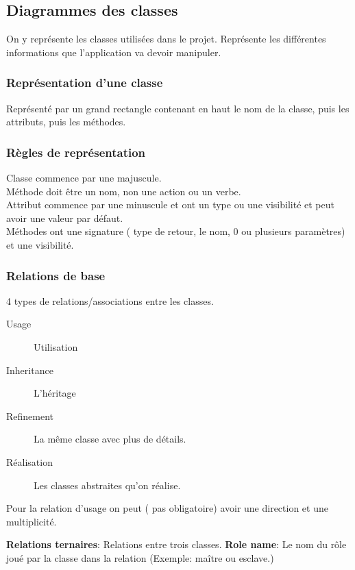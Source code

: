 \subsection{Diagrammes des classes}
On y représente les classes utilisées dans le projet. Représente les différentes informations que l’application va devoir manipuler.



\subsubsection{Représentation d’une classe}
Représenté par un grand rectangle contenant en haut le nom de la classe, puis les attributs, puis les méthodes.



\subsubsection{Règles de représentation}
Classe commence par une majuscule.
\\Méthode doit être un nom, non une action ou un verbe.
\\Attribut commence par une minuscule et ont un type ou une visibilité et peut avoir une valeur par défaut.
\\Méthodes ont une signature ( type de retour, le nom, 0 ou plusieurs paramètres) et une visibilité.



\subsubsection{Relations de base}
4 types de relations/associations entre les classes.
\begin{description}
	\item [Usage] Utilisation
	\item [Inheritance] L’héritage
	\item [Refinement] La même classe avec plus de détails.
	\item [Réalisation] Les classes abstraites qu’on réalise.
\end{description}

Pour la relation d’usage on peut ( pas obligatoire) avoir une direction et une multiplicité.

\textbf{Relations ternaires}: Relations entre trois classes.
\textbf{Role name}: Le nom du rôle joué par la classe dans la relation (Exemple: maître ou esclave.)



